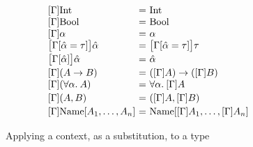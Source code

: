 \begin{figure}[h]
\begin{minipage}{\textwidth}
  
  \end{minipage}
  \hfill
  \begin{minipage}{\textwidth}
    \centering
      \[
  \begin{array}[t]{l@{~}c@{~}ll}
      [\Gamma]\Inttype  & = & \Inttype &\\{}

      [\Gamma]\Booltype & = & \Booltype &\\{}

      [\Gamma]\alpha    & = & \alpha &\\{}
      \big[\Gamma[\hypeq{\ahat}{\tau}]\big] \ahat
               & = &   \big[\Gamma[\hypeq{\ahat}{\tau}]\big]\tau &
      \\[2pt]
      \big[\Gamma[\ahat]\big]\ahat   & = &   \ahat &
      \\[2pt]
      [\Gamma](A \arr B)   & = &
          ([\Gamma]A) \arr ([\Gamma]B) &
      \\{}
      [\Gamma](\alltype{\alpha} A)
         & = & 
         \alltype{\alpha} [\Gamma]A &
      \\[2pt]
      [\Gamma](A, B) 
         & = &
         ([\Gamma]A, [\Gamma]B)
      \\[2pt]
      [\Gamma]\Unionname[A_1,\dots, A_n]
         & = &
         \Unionname[[\Gamma]A_1,\dots, [\Gamma]A_n]
  \end{array}
  \]
  \captionsetup{justification=centering}\caption{Applying a context, as a substitution, to a type}
  \end{minipage}
\end{figure}
